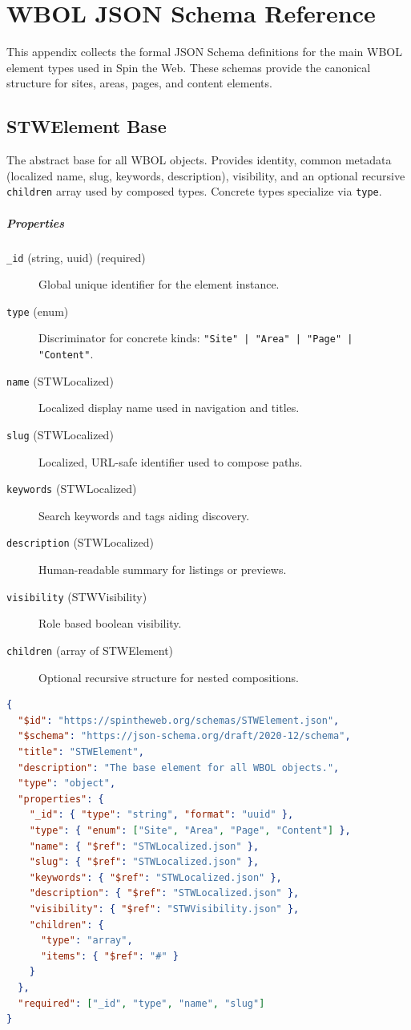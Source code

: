 
\chapter{WBOL JSON Schema Reference}
\label{app:wbol-json-schema}

This appendix collects the formal JSON Schema definitions for the main WBOL element types used in Spin the Web. These schemas provide the canonical structure for sites, areas, pages, and content elements.

\section{STWElement Base}
The abstract base for all WBOL objects. Provides identity, common metadata (localized name, slug, keywords, description), visibility, and an optional recursive \texttt{children} array used by composed types. Concrete types specialize via \texttt{type}.
\paragraph{Properties}
\begin{description}
  \item[\texttt{\_id} (string, uuid) (required)] Global unique identifier for the element instance.
  \item[\texttt{type} (enum)] Discriminator for concrete kinds: \texttt{"Site" | "Area" | "Page" | "Content"}.
  \item[\texttt{name} (STWLocalized)] Localized display name used in navigation and titles.
  \item[\texttt{slug} (STWLocalized)] Localized, URL-safe identifier used to compose paths.
  \item[\texttt{keywords} (STWLocalized)] Search keywords and tags aiding discovery.
  \item[\texttt{description} (STWLocalized)] Human-readable summary for listings or previews.
  \item[\texttt{visibility} (STWVisibility)] Role based boolean visibility.
  \item[\texttt{children} (array of STWElement)] Optional recursive structure for nested compositions.
\end{description}
\begin{lstlisting}[language=JSON,caption={STWElement Base Schema Definition}]
{
  "$id": "https://spintheweb.org/schemas/STWElement.json",
  "$schema": "https://json-schema.org/draft/2020-12/schema",
  "title": "STWElement",
  "description": "The base element for all WBOL objects.",
  "type": "object",
  "properties": {
    "_id": { "type": "string", "format": "uuid" },
    "type": { "enum": ["Site", "Area", "Page", "Content"] },
    "name": { "$ref": "STWLocalized.json" },
    "slug": { "$ref": "STWLocalized.json" },
    "keywords": { "$ref": "STWLocalized.json" },
    "description": { "$ref": "STWLocalized.json" },
    "visibility": { "$ref": "STWVisibility.json" },
    "children": {
      "type": "array",
      "items": { "$ref": "#" }
    }
  },
  "required": ["_id", "type", "name", "slug"]
}
\end{lstlisting}

